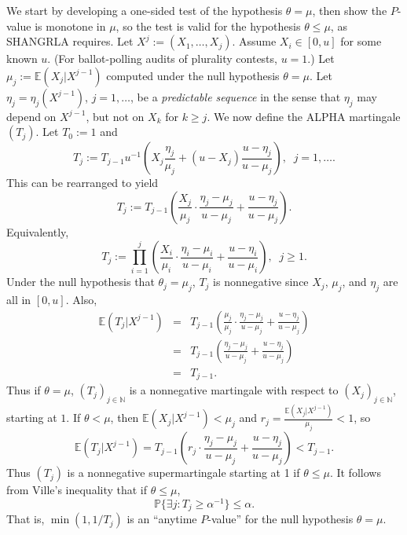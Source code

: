 \documentclass[12pt,runningheads]{llncs}
\newcommand{\EE}{\mathbb{E}}
\renewcommand{\Pr}{\mathbb{P}}
\begin{document}
{We start by developing a one-sided test of the hypothesis $\theta = \mu$, then show the $P$-value is monotone in
$\mu$, so the test is valid for the hypothesis $\theta \le \mu$, as SHANGRLA requires.
Let $X^j := (X_1, \ldots, X_j)$.
Assume $X_i \in [0, u]$ for some known $u$. 
(For ballot-polling audits of plurality contests, $u=1$.)
Let $\mu_j := \EE(X_j | X^{j-1})$ computed under the null hypothesis $\theta = \mu$. 
Let $\eta_j = \eta_j(X^{j-1})$, $j=1, \ldots$, be a \emph{predictable sequence} in the sense that 
$\eta_j$ may depend on $X^{j-1}$, but not on $X_k$ for $k \ge j$.
We now define the ALPHA martingale $(T_j)$.
Let $T_0 := 1$ and
\begin{equation}
    T_j := T_{j-1} u^{-1}\left ( X_j\frac{\eta_j}{\mu_j} + (u-X_j) \frac{u-\eta_j}{u-\mu_j} \right ), \;\; j=1, \ldots . \label{eq:alphaBRAVOdef}
\end{equation}
This can be rearranged to yield
\begin{equation}
    T_j := T_{j-1} \left ( \frac{X_j}{\mu_j} \cdot \frac{\eta_j-\mu_j}{u-\mu_j} + \frac{u-\eta_j}{u-\mu_j} \right ). \label{eq:alphaMult}
\end{equation}
Equivalently,
\begin{equation}
    T_j := \prod_{i=1}^j \left ( \frac{X_i}{\mu_i} \cdot \frac{\eta_i-\mu_i}{u-\mu_i} + \frac{u-\eta_i}{u-\mu_i} \right ), \;\; j \ge 1. \label{eq:alphaMultProd}
\end{equation}
Under the null hypothesis that $\theta_j = \mu_j$, $T_j$ is nonnegative since $X_j$, $\mu_j$, and $\eta_j$
are all in $[0, u]$.
Also,
\begin{eqnarray}
    \EE (T_j | X^{j-1} ) &=& T_{j-1} \left ( \frac{\mu_j}{\mu_j} \cdot \frac{\eta_j-\mu_j}{u-\mu_j} + \frac{u-\eta_j}{u-\mu_j} \right ) \nonumber \\
    &=&  T_{j-1} \left ( \frac{\eta_j-\mu_j}{u-\mu_j} + \frac{u-\eta_j}{u-\mu_j} \right ) \nonumber \\
    &=& T_{j-1}.
\end{eqnarray}
Thus if $\theta = \mu$, $(T_j)_{j \in \mathbb{N}}$ is a nonnegative martingale with respect to $(X_j)_{j \in \mathbb{N}}$, starting at $1$.
If $\theta < \mu$, then $\EE (X_j | X^{j-1}) < \mu_j$ and $r_j = \frac{\EE (X_j | X^{j-1})}{\mu_j} < 1$, so
\begin{equation} \label{eq:supermartingale}
    \EE (T_j | X^{j-1} ) = T_{j-1} \left ( r_j \cdot \frac{\eta_j-\mu_j}{u-\mu_j} + \frac{u-\eta_j}{u-\mu_j} \right ) < T_{j-1}.
\end{equation}
Thus $(T_j)$ is a nonnegative supermartingale starting at 1 if $\theta \le \mu$.
It follows from Ville's inequality \cite{ville39} that if $\theta \le \mu$,
\begin{equation} \label{eq:p-value-adapt}
\Pr \{ \exists j :  T_j \ge \alpha^{-1} \} \le \alpha.
\end{equation}
That is, $\min(1, 1/T_j)$ is an ``anytime $P$-value'' for the null hypothesis $\theta = \mu$.

}
\end{document}
